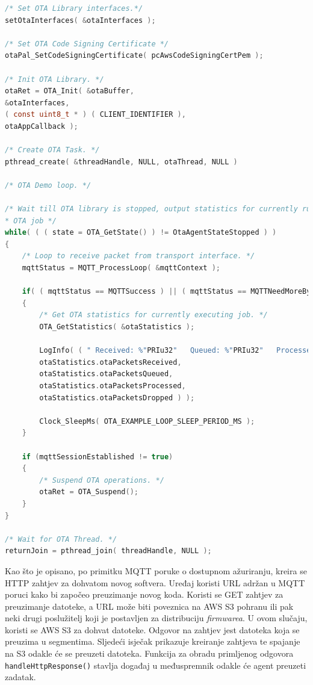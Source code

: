 \begin{lstlisting}[caption={Rad OTA agenta}, language=c]
    /* Set OTA Library interfaces.*/
setOtaInterfaces( &otaInterfaces );

/* Set OTA Code Signing Certificate */
otaPal_SetCodeSigningCertificate( pcAwsCodeSigningCertPem );

/* Init OTA Library. */
otaRet = OTA_Init( &otaBuffer,
&otaInterfaces,
( const uint8_t * ) ( CLIENT_IDENTIFIER ),
otaAppCallback );

/* Create OTA Task. */
pthread_create( &threadHandle, NULL, otaThread, NULL )

/* OTA Demo loop. */

/* Wait till OTA library is stopped, output statistics for currently running
* OTA job */
while( ( ( state = OTA_GetState() ) != OtaAgentStateStopped ) )
{
	/* Loop to receive packet from transport interface. */
	mqttStatus = MQTT_ProcessLoop( &mqttContext );
	
	if( ( mqttStatus == MQTTSuccess ) || ( mqttStatus == MQTTNeedMoreBytes ) )
	{
		/* Get OTA statistics for currently executing job. */
		OTA_GetStatistics( &otaStatistics );
		
		LogInfo( ( " Received: %"PRIu32"   Queued: %"PRIu32"   Processed: %"PRIu32"   Dropped: %"PRIu32"",
		otaStatistics.otaPacketsReceived,
		otaStatistics.otaPacketsQueued,
		otaStatistics.otaPacketsProcessed,
		otaStatistics.otaPacketsDropped ) );
		
		Clock_SleepMs( OTA_EXAMPLE_LOOP_SLEEP_PERIOD_MS );
	}
	
	if (mqttSessionEstablished != true)
	{
		/* Suspend OTA operations. */
		otaRet = OTA_Suspend();
	}
}

/* Wait for OTA Thread. */
returnJoin = pthread_join( threadHandle, NULL );
\end{lstlisting}

Kao što je opisano, po primitku MQTT poruke o dostupnom ažuriranju, kreira se HTTP zahtjev za dohvatom novog softvera. Uređaj koristi URL adržan u MQTT poruci kako bi započeo preuzimanje novog koda. Koristi se GET zahtjev za preuzimanje datoteke, a URL može biti poveznica na AWS S3 pohranu ili pak neki drugi poslužitelj koji je postavljen za distribuciju \textit{firmwarea}. U ovom slučaju, koristi se AWS S3 za dohvat datoteke. Odgovor na zahtjev jest datoteka koja se preuzima u segmentima. Sljedeći isječak prikazuje kreiranje zahtjeva te spajanje na S3 odakle će se preuzeti datoteka. Funkcija za obradu primljenog odgovora \lstinline|handleHttpResponse()| stavlja događaj u međuspremnik odakle će agent preuzeti zadatak. 

